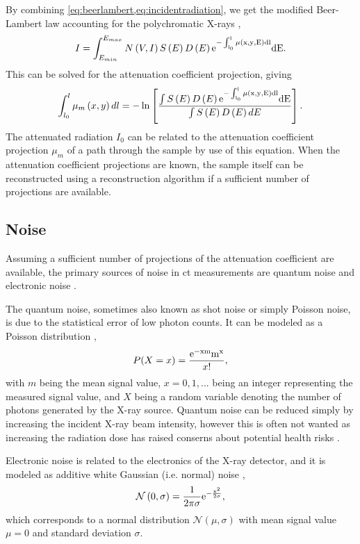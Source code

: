 By combining \cref{eq:beerlambert,eq:incidentradiation}, we get the modified Beer-Lambert law accounting for the polychromatic X-rays \cite{doi:10.1063/1.4950807}, 
\begin{equation}
    I = \int_{E_{min}}^{E_{max}}N\left(V,I\right)S\left(E\right)D\left(E\right)\rm{e}^{-\int_{l_0}^{l}\mu\left(x,y,E\right)dl}dE.
\end{equation}
This can be solved for the attenuation coefficient projection, giving \cite{doi:10.1063/1.4950807}
\begin{equation}
    \label{eq:ctattenuationcoefficient}
    \int_{l_0}^{l} \mu_m\left(x,y\right)dl = -\ln\left[\frac{\int S\left(E\right) D\left(E\right)\rm{e}^{-\int_{l_0}^{l}\mu\left(x,y,E\right)dl} dE }{ \int S\left(E\right) D\left(E\right) dE }\right].
\end{equation}
The attenuated radiation $I_0$ can be related to the attenuation coefficient projection $\mu_m$ of a path through the sample by use of this equation. When the attenuation coefficient projections are known, the sample itself can be reconstructed using a reconstruction algorithm if a sufficient number of projections are available. 

\subsection{Noise}
Assuming a sufficient number of projections of the attenuation coefficient are available, the primary sources of noise in \acrshort{ct} measurements are quantum noise and electronic noise \cite{boas2012ct}. 

The quantum noise, sometimes also known as shot noise or simply Poisson noise, is due to the statistical error of low photon counts. It can be modeled as a Poisson distribution \cite{Whiting2006},
\begin{equation}
    \label{eq:poissonnoise}
    P(X = x) = \frac{\rm{e}^{-xm}m^x}{x!},
\end{equation}
with $m$ being the mean signal value, $x=0,1,...$ being an integer representing the measured signal value, and $X$ being a random variable denoting the number of photons generated by the X-ray source. Quantum noise can be reduced simply by increasing the incident X-ray beam intensity, however this is often not wanted as increasing the radiation dose has raised conserns about potential health risks \cite{doi:10.1056/NEJMra072149,PEARCE2012499}. 

Electronic noise is related to the electronics of the X-ray detector, and it is modeled as additive white Gaussian (i.e. normal) noise \cite{boas2012ct},
\begin{equation}
    \mathcal{N}\left(0,\sigma \right) = \frac{1}{2\pi\sigma}\rm{e}^{-\frac{x^2}{2\sigma}},
\end{equation}
which corresponds to a normal distribution $\mathcal{N}\left(\mu,\sigma\right)$ with mean signal value $\mu=0$ and standard deviation $\sigma$. 

